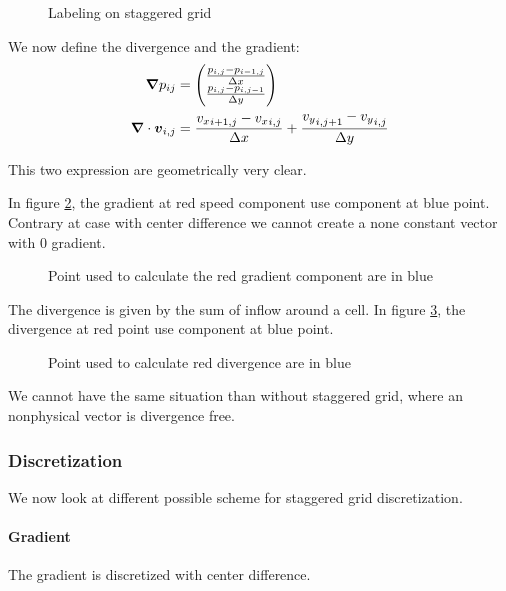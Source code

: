 \begin{figure}
\caption{Labeling on staggered grid}
\label{fixed:staggered_label}
\end{figure}

We now define the divergence and the gradient:
\begin{align}
  {\boldsymbol {\nabla}}p_{ij}&=\begin{pmatrix}
    \frac{p_{i,j}-p_{i-1,j}}{\Delta x}\\
    \frac{p_{i,j}-p_{i,j-1}}{\Delta y}\\
                      \end{pmatrix}\\
  {\boldsymbol {\nabla}}\cdot {\boldsymbol {v}}_{i,j}&=\frac{{v_{x}}_{i+1,j}-{v_{x}}_{i,j}}{\Delta x}+\frac{{v_{y}}_{i,j+1}-{v_{y}}_{i,j}}{\Delta y}
\end{align}

This two expression are geometrically very clear.

In figure \ref{fixed:staggered_gradient}, the gradient at red speed component use component at blue point.
Contrary at case with center difference we cannot create a none constant vector with 0 gradient.

\begin{figure}
\caption{Point used to calculate the red gradient component are in blue}
\label{fixed:staggered_gradient}
\end{figure}

The divergence is given by the sum of inflow around a cell.
In figure \ref{fixed:staggered_divergence}, the divergence at red point use component at blue point.

\begin{figure}
\caption{Point used to calculate red divergence are in blue}
\label{fixed:staggered_divergence}
\end{figure}

We cannot have the same situation than without staggered grid, where an nonphysical vector is divergence free.

\subsubsection{Discretization}

We now look at different possible scheme for staggered grid discretization.

\paragraph{Gradient}
\label{fixed:gradient}
The gradient is discretized with center difference.

